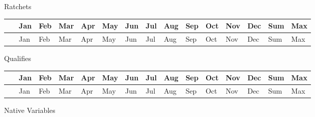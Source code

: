 Ratchets

\begin{longtable}[c]{@{}lllllllllllllll@{}}
\toprule 
~ & Jan & Feb & Mar & Apr & May & Jun & Jul & Aug & Sep & Oct & Nov & Dec & Sum & Max \tabularnewline
\midrule
\endfirsthead

\toprule 
~ & Jan & Feb & Mar & Apr & May & Jun & Jul & Aug & Sep & Oct & Nov & Dec & Sum & Max \tabularnewline
\midrule
\endhead

\bottomrule
\end{longtable}

Qualifies

\begin{longtable}[c]{@{}lllllllllllllll@{}}
\toprule 
~ & Jan & Feb & Mar & Apr & May & Jun & Jul & Aug & Sep & Oct & Nov & Dec & Sum & Max \tabularnewline
\midrule
\endfirsthead

\toprule 
~ & Jan & Feb & Mar & Apr & May & Jun & Jul & Aug & Sep & Oct & Nov & Dec & Sum & Max \tabularnewline
\midrule
\endhead

\bottomrule
\end{longtable}

Native Variables

